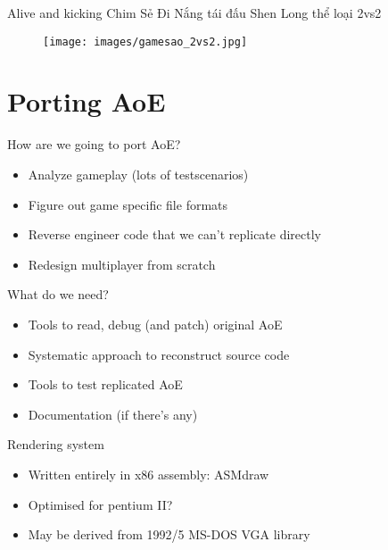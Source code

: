 \documentclass{beamer}
\begin{document}

\begin{frame}{Alive and kicking}
	Chim Sẻ Đi Nắng tái đấu Shen Long thể loại 2vs2

	\begin{figure}
	\texttt{[image: images/gamesao\_2vs2.jpg]}
	\end{figure}

\end{frame}


\section{Porting AoE}

\begin{frame}{How are we going to port AoE?}

	\begin{itemize}
		\item Analyze gameplay (lots of testscenarios)
		\item Figure out game specific file formats
		\item Reverse engineer code that we can't replicate directly
		\item Redesign multiplayer from scratch
	\end{itemize}

\end{frame}


\begin{frame}{What do we need?}
	\begin{itemize}
		\item Tools to read, debug (and patch) original AoE
		\item Systematic approach to reconstruct source code
		\item Tools to test replicated AoE
		\item Documentation (if there's any)
	\end{itemize}

\end{frame}


\begin{frame}{Rendering system}
	\begin{itemize}
		\item Written entirely in x86 assembly: ASMdraw
		\item Optimised for pentium II?
		\item May be derived from 1992/5 MS-DOS VGA library
	\end{itemize}

\end{frame}
\end{document}
